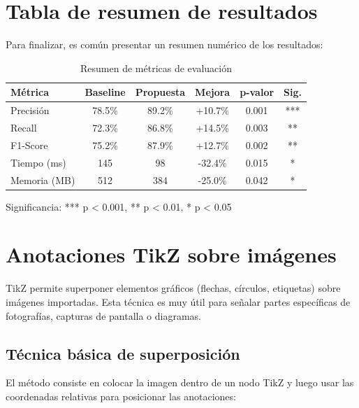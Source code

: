 \section{Tabla de resumen de resultados}
\label{sec:tabla-resumen}

Para finalizar, es común presentar un resumen numérico de los resultados:

\begin{table}[htbp]
  \centering
  \caption{Resumen de métricas de evaluación}
  \label{tab:resumen-metricas}
  \EPScabeceraTabla
  \begin{tabular}{@{}lccccc@{}}
    \toprule
    \textbf{Métrica} & \textbf{Baseline} & \textbf{Propuesta} & \textbf{Mejora} & \textbf{p-valor} & \textbf{Sig.} \\
    \midrule
    Precisión & 78.5\% & 89.2\% & +10.7\% & 0.001 & *** \\
    Recall & 72.3\% & 86.8\% & +14.5\% & 0.003 & ** \\
    F1-Score & 75.2\% & 87.9\% & +12.7\% & 0.002 & ** \\
    Tiempo (ms) & 145 & 98 & -32.4\% & 0.015 & * \\
    Memoria (MB) & 512 & 384 & -25.0\% & 0.042 & * \\
    \bottomrule
  \end{tabular}

  \medskip
  \footnotesize
  Significancia: *** p < 0.001, ** p < 0.01, * p < 0.05
\end{table}

\section{Anotaciones TikZ sobre imágenes}
\label{sec:anotaciones-tikz}

TikZ permite superponer elementos gráficos (flechas, círculos, etiquetas) sobre imágenes importadas. Esta técnica es muy útil para señalar partes específicas de fotografías, capturas de pantalla o diagramas.

\subsection{Técnica básica de superposición}
\label{subsec:superposicion-basica}

El método consiste en colocar la imagen dentro de un nodo TikZ y luego usar las coordenadas relativas para posicionar las anotaciones:

